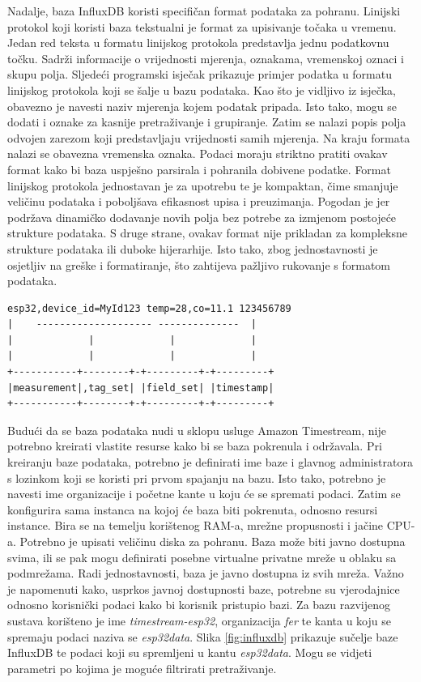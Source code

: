 Nadalje, baza InfluxDB koristi specifičan format podataka za pohranu. Linijski protokol  koji koristi baza tekstualni je format za upisivanje točaka u vremenu. Jedan red teksta u formatu linijskog protokola predstavlja jednu podatkovnu točku. Sadrži informacije o vrijednosti mjerenja, oznakama, vremenskoj oznaci i skupu polja. Sljedeći programski isječak prikazuje primjer podatka u formatu linijskog protokola koji se šalje u bazu podataka. Kao što je vidljivo iz isječka, obavezno je navesti naziv mjerenja kojem podatak pripada. Isto tako, mogu se dodati i oznake za kasnije pretraživanje i grupiranje. Zatim se nalazi popis polja odvojen zarezom koji predstavljaju vrijednosti samih mjerenja. Na kraju formata nalazi se obavezna vremenska oznaka. Podaci moraju striktno pratiti ovakav format kako bi baza uspješno parsirala i pohranila dobivene podatke. Format linijskog protokola jednostavan je za upotrebu te je kompaktan, čime smanjuje veličinu podataka i poboljšava efikasnost upisa i preuzimanja. Pogodan je jer podržava dinamičko dodavanje novih polja bez potrebe za izmjenom postojeće strukture podataka. S druge strane, ovakav format nije prikladan za kompleksne strukture podataka ili duboke hijerarhije. Isto tako, zbog jednostavnosti je osjetljiv na greške i formatiranje, što zahtijeva pažljivo rukovanje s formatom podataka.  

\begin{lstlisting}[caption={Podatak u bazi InfluxDB u formatu linijskog protokola}]
esp32,device_id=MyId123 temp=28,co=11.1 123456789
|    -------------------- --------------  |
|             |             |             |
|             |             |             |
+-----------+--------+-+---------+-+---------+
|measurement|,tag_set| |field_set| |timestamp|
+-----------+--------+-+---------+-+---------+
\end{lstlisting}

Budući da se baza podataka nudi u sklopu usluge Amazon Timestream, nije potrebno kreirati vlastite resurse kako bi se baza pokrenula i održavala. Pri kreiranju baze podataka, potrebno je definirati ime baze i glavnog administratora s lozinkom koji se koristi pri prvom spajanju na bazu. Isto tako, potrebno je navesti ime organizacije i početne kante u koju će se spremati podaci. Zatim se konfigurira sama instanca na kojoj će baza biti pokrenuta, odnosno resursi instance. Bira se na temelju korištenog RAM-a, mrežne propusnosti i jačine CPU-a. Potrebno je upisati veličinu diska za pohranu. Baza može biti javno dostupna svima, ili se pak mogu definirati posebne virtualne privatne mreže u oblaku  sa podmrežama. Radi jednostavnosti, baza je javno dostupna iz svih mreža. Važno je napomenuti kako, usprkos javnoj dostupnosti baze, potrebne su vjerodajnice odnosno korisnički podaci kako bi korisnik pristupio bazi. Za bazu razvijenog sustava korišteno je ime \textit{timestream-esp32}, organizacija \textit{fer} te kanta u koju se spremaju podaci naziva se \textit{esp32data}. Slika \ref{fig:influxdb} prikazuje sučelje baze InfluxDB te podaci koji su spremljeni u kantu \textit{esp32data}. Mogu se vidjeti parametri po kojima je moguće filtrirati pretraživanje. 

